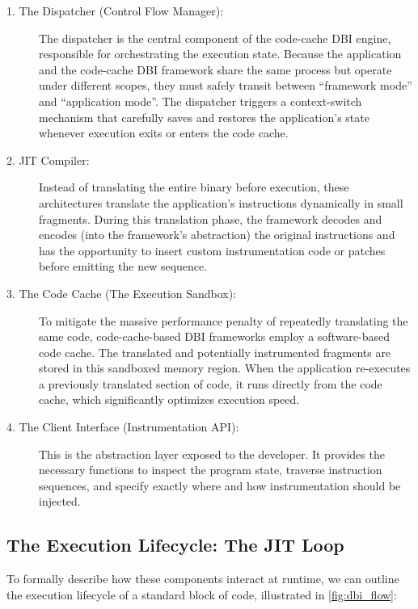 \begin{description}
	\item[1. The Dispatcher (Control Flow Manager):] The dispatcher is the central component of the code-cache \ac{DBI} engine, responsible for orchestrating the execution state.
	Because the application and the code-cache \ac{DBI} framework share the same process but operate under different scopes, they must safely transit between ``framework mode'' and ``application mode''.
	The dispatcher triggers a context-switch mechanism that carefully saves and restores the application's state whenever execution exits or enters the code cache.
	\item[2. \ac{JIT} Compiler:] Instead of translating the entire binary before execution, these architectures translate the application's instructions dynamically in small fragments.
	During this translation phase, the framework decodes and encodes (into the framework's abstraction) the original instructions and has the opportunity to insert custom instrumentation code or patches before emitting the new sequence.
	\item[3. The Code Cache (The Execution Sandbox):] To mitigate the massive performance penalty of repeatedly translating the same code, code-cache-based \ac{DBI} frameworks employ a software-based code cache.
	The translated and potentially instrumented fragments are stored in this sandboxed memory region.
	When the application re-executes a previously translated section of code, it runs directly from the code cache, which significantly optimizes execution speed.
	\item[4. The Client Interface (Instrumentation API):] This is the abstraction layer exposed to the developer.
	It provides the necessary functions to inspect the program state, traverse instruction sequences, and specify exactly where and how instrumentation should be injected.
\end{description}

\subsection{The Execution Lifecycle: The JIT Loop}
To formally describe how these components interact at runtime, we can outline the execution lifecycle of a standard block of code, illustrated in \cref{fig:dbi_flow}:

